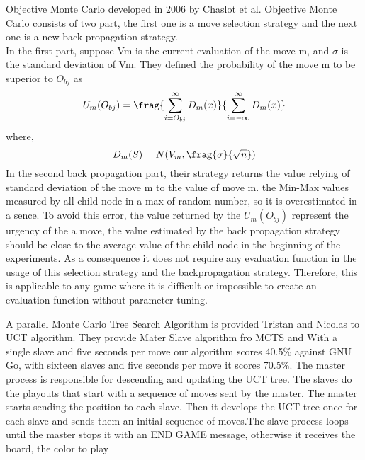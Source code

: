 Objective Monte Carlo developed in 2006 by Chaslot et al. Objective Monte Carlo consists of two part, the first one is a move selection strategy and the next one is a new back propagation strategy. \\
In the first part, suppose Vm is the current evaluation of the move m, and \(\sigma\) is the standard deviation of Vm. They defined the probability of the move m to be superior to \(O_{bj}\) as 
\[U_{m}(O_{bj}) = \frag
	{\sum_{i=O_{bj}}^{\infty} D_{m}(x)}
	{\sum_{i=-\infty}^{\infty} D_{m}(x)}\]
where, \[D_{m}(S) = N(V_{m}, \frag{\sigma}{\sqrt n}) \]
In the second back propagation part, their strategy returns the value relying of standard deviation of the move m to the value of move m. the Min-Max values measured by all child node in a max of random number, so it is overestimated in a sence. To avoid this error, the value returned by the 
\(U_{m}(O_{bj})\) represent the urgency of the a move, the value estimated by the back propagation strategy should be close to the average value of the child node in the beginning of the experiments.
As a consequence it does not require any evaluation function in the usage of this selection strategy and the backpropagation strategy. Therefore, this is applicable to any game where it is difficult or impossible  to create an evaluation function without parameter tuning.

A parallel Monte Carlo Tree Search Algorithm is provided Tristan and Nicolas to UCT algorithm. They provide Mater Slave algorithm fro MCTS and With a single slave and five seconds per move our algorithm scores 40.5\% against GNU Go, with sixteen slaves and five seconds per move it scores 70.5\%. The master process is responsible for descending and updating the UCT tree. The slaves do the playouts  that start with a sequence of moves sent by the master. The master starts sending the position to each slave. Then it develops the UCT tree once for each slave and sends them an initial sequence of moves.The slave process loops until the master stops it with an END GAME message, otherwise it receives the board, the color to play







